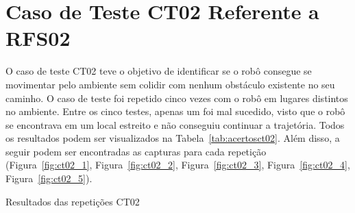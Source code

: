 \section{Caso de Teste CT02 Referente a RFS02}
O caso de teste CT02 teve o objetivo de identificar se o robô consegue se movimentar pelo ambiente sem colidir com nenhum obstáculo existente no seu caminho.  O caso de teste foi repetido cinco vezes com o robô em lugares distintos no ambiente. Entre os cinco testes, apenas um foi mal sucedido, visto que o robô se encontrava em um local estreito e não conseguiu continuar a trajetória. Todos os resultados podem ser visualizados na Tabela~\ref{tab:acertosct02}. Além disso, a seguir podem ser encontradas as capturas para cada repetição (Figura~\ref{fig:ct02_1}, Figura~\ref{fig:ct02_2}, Figura~\ref{fig:ct02_3}, Figura~\ref{fig:ct02_4}, Figura~\ref{fig:ct02_5}).


\begin{table}[H]
\centering
\caption{Resultados das repetições CT02}
\label{tab:acertosct02}
\caption*{Fonte: Autora (2023).}
\end{table}

